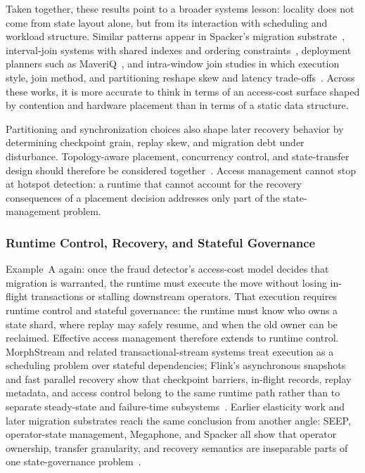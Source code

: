 \documentclass[manuscript]{acmart}
\begin{document}
Taken together, these results point to a broader systems lesson: locality does not come from state layout alone, but from its interaction with scheduling and workload structure. Similar patterns appear in Spacker's migration substrate~\cite{mao2025spacker}, interval-join systems with shared indexes and ordering constraints~\cite{zhang2023openmldb}, deployment planners such as MaveriQ~\cite{liakopoulos2025maveriq}, and intra-window join studies in which execution style, join method, and partitioning reshape skew and latency trade-offs~\cite{zhang2021intrawindowjoin}. Across these works, it is more accurate to think in terms of an access-cost surface shaped by contention and hardware placement than in terms of a static data structure.

Partitioning and synchronization choices also shape later recovery behavior by determining checkpoint grain, replay skew, and migration debt under disturbance. Topology-aware placement, concurrency control, and state-transfer design should therefore be considered together~\cite{zhang2019briskstream,zhang2020concurrent,carbone2015asynchronous,zhao2024recovery,mao2025spacker}. Access management cannot stop at hotspot detection: a runtime that cannot account for the recovery consequences of a placement decision addresses only part of the state-management problem.

\subsubsection{Runtime Control, Recovery, and Stateful Governance}

Example~A again: once the fraud detector's access-cost model decides that migration is warranted, the runtime must execute the move without losing in-flight transactions or stalling downstream operators. That execution requires runtime control and stateful governance: the runtime must know who owns a state shard, where replay may safely resume, and when the old owner can be reclaimed. Effective access management therefore extends to runtime control. MorphStream and related transactional-stream systems treat execution as a scheduling problem over stateful dependencies; Flink's asynchronous snapshots and fast parallel recovery show that checkpoint barriers, in-flight records, replay metadata, and access control belong to the same runtime path rather than to separate steady-state and failure-time subsystems~\cite{mao2023morphstream,zhao2025morphstream,carbone2015asynchronous,zhao2024recovery}. Earlier elasticity work and later migration substrates reach the same conclusion from another angle: SEEP, operator-state management, Megaphone, and Spacker all show that operator ownership, transfer granularity, and recovery semantics are inseparable parts of one state-governance problem~\cite{fernandez2010seep,fernandez2013osm,nasir2019megaphone,mao2025spacker}.
\end{document}
